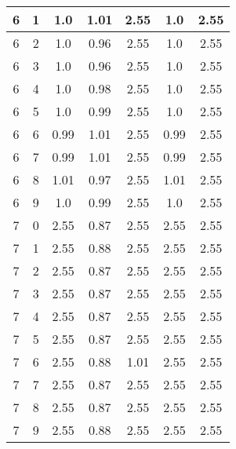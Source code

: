 \begin{longtable}{|c|c||c||c|c||c|c|}
	6 & 1 & 1.0 & 1.01 & 2.55 & 1.0 & 2.55 \\ \hline
	6 & 2 & 1.0 & 0.96 & 2.55 & 1.0 & 2.55 \\ \hline
	6 & 3 & 1.0 & 0.96 & 2.55 & 1.0 & 2.55 \\ \hline
	6 & 4 & 1.0 & 0.98 & 2.55 & 1.0 & 2.55 \\ \hline
	6 & 5 & 1.0 & 0.99 & 2.55 & 1.0 & 2.55 \\ \hline
	6 & 6 & 0.99 & 1.01 & 2.55 & 0.99 & 2.55 \\ \hline
	6 & 7 & 0.99 & 1.01 & 2.55 & 0.99 & 2.55 \\ \hline
	6 & 8 & 1.01 & 0.97 & 2.55 & 1.01 & 2.55 \\ \hline
	6 & 9 & 1.0 & 0.99 & 2.55 & 1.0 & 2.55 \\ \hline
	7 & 0 & 2.55 & 0.87 & 2.55 & 2.55 & 2.55 \\ \hline
	7 & 1 & 2.55 & 0.88 & 2.55 & 2.55 & 2.55 \\ \hline
	7 & 2 & 2.55 & 0.87 & 2.55 & 2.55 & 2.55 \\ \hline
	7 & 3 & 2.55 & 0.87 & 2.55 & 2.55 & 2.55 \\ \hline
	7 & 4 & 2.55 & 0.87 & 2.55 & 2.55 & 2.55 \\ \hline
	7 & 5 & 2.55 & 0.87 & 2.55 & 2.55 & 2.55 \\ \hline
	7 & 6 & 2.55 & 0.88 & 1.01 & 2.55 & 2.55 \\ \hline
	7 & 7 & 2.55 & 0.87 & 2.55 & 2.55 & 2.55 \\ \hline
	7 & 8 & 2.55 & 0.87 & 2.55 & 2.55 & 2.55 \\ \hline
	7 & 9 & 2.55 & 0.88 & 2.55 & 2.55 & 2.55 \\ \hline
\end{longtable}
\clearpage{}
